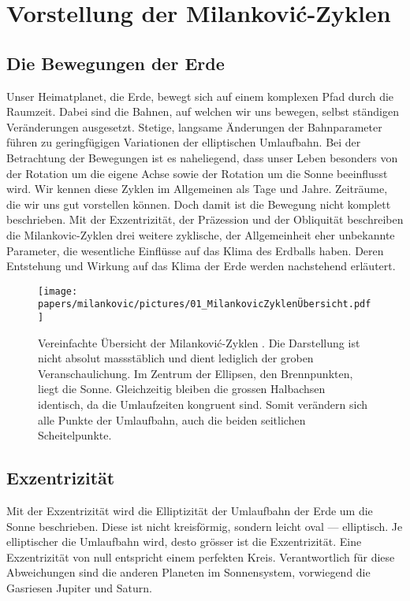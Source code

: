 %
%
%
%
\section{Vorstellung der Milankovi\'c-Zyklen
\label{milankovic:section:VorstellungMIlankovic-Zyklen}}

\subsection{Die Bewegungen der Erde
\label{milankovic:subsection:BewegungenderErde}}
Unser Heimatplanet, die Erde, bewegt sich auf einem komplexen Pfad durch die Raumzeit.
Dabei sind die Bahnen, auf welchen wir uns bewegen, selbst ständigen Veränderungen ausgesetzt.
Stetige, langsame Änderungen der Bahnparameter führen zu geringfügigen Variationen der elliptischen Umlaufbahn.
Bei der Betrachtung der Bewegungen ist es naheliegend, dass unser Leben besonders von der Rotation um die eigene Achse sowie der Rotation um die Sonne beeinflusst wird.
Wir kennen diese Zyklen im Allgemeinen als Tage und Jahre.
Zeiträume, die wir uns gut vorstellen können.
Doch damit ist die Bewegung nicht komplett beschrieben.
Mit der Exzentrizität, der Präzession und der Obliquität beschreiben die Milankovic-Zyklen drei weitere zyklische, der Allgemeinheit eher unbekannte Parameter, die wesentliche Einflüsse auf das Klima des Erdballs haben.
%
%
%
Deren Entstehung und Wirkung auf das Klima der Erde werden nachstehend erläutert.

\begin{figure}
	\centering
	\texttt{[image: papers/milankovic/pictures/01\_MilankovicZyklenÜbersicht.pdf]}
	\caption{Vereinfachte Übersicht der Milankovi\'c-Zyklen
	\cite{milankovic:Übersicht-Milankovic-Zyklen}.
		Die Darstellung ist nicht absolut massstäblich und dient lediglich der groben Veranschaulichung. Im Zentrum der Ellipsen, den Brennpunkten, liegt die Sonne. Gleichzeitig bleiben die grossen Halbachsen identisch, da die Umlaufzeiten kongruent sind. Somit verändern sich alle Punkte der Umlaufbahn, auch die beiden seitlichen Scheitelpunkte. 
	\label{picture Übersicht Milankovic-Zyklen}}
\end{figure}

\subsection{Exzentrizität
\label{milankovic:subsection:Exzentrizität}}
%
Mit der Exzentrizität wird die Elliptizität der Umlaufbahn der Erde um die Sonne beschrieben.
Diese ist nicht kreisförmig, sondern leicht oval --- elliptisch.
Je elliptischer die Umlaufbahn wird, desto grösser ist die Exzentrizität.
Eine Exzentrizität von null entspricht einem perfekten Kreis.
Verantwortlich für diese Abweichungen sind die anderen Planeten im Sonnensystem, vorwiegend die Gasriesen Jupiter und Saturn.

